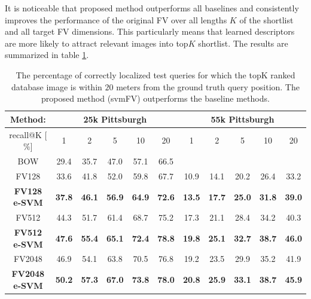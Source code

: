 \documentclass[table]{article} %
\begin{document}
		It is noticeable that proposed method outperforms all baselines and consistently improves the performance of the original FV over all lengths $K$ of the shortlist and all target FV dimensions. This particularly means that learned descriptors are more likely to attract relevant images into top$K$ shortlist. The results are summarized in table \ref{tab:recall}.

\begin{table}[t!]
\begin{centering}
	\begin{tabularx}{0.94\linewidth}{|c|c c c c c|c c c c c|}
		\hline 
		\rowcolor{maroon!50}
		Method: & \multicolumn{5}{c|}{25k Pittsburgh} & \multicolumn{5}{c|}{55k Pittsburgh} \\
		\hline 
		\hline 
		\rowcolor{maroon!50}
		recall@K [$\%$] & 1 & 2 & 5 & 10 & 20 & 1 & 2 & 5 & 10 & 20\\
		\hline
		\rowcolor{maroon!10}
		BOW & 29.4 & 35.7 & 47.0 & 57.1 & 66.5 &  &  &  &  & \\
        \hline
		\rowcolor{maroon!10}
		FV128         & 33.6 & 41.8 & 52.0 & 59.8 & 67.7 & 10.9 & 14.1 & 20.2 & 26.4 & 33.2 \\
		\rowcolor{maroon!10}
		\textbf{FV128 e-SVM}   & \textbf{37.8}  & \textbf{46.1} & \textbf{56.9} & \textbf{64.9} & \textbf{72.6}  &
                                 \textbf{13.5}  &  \textbf{17.7}  &  \textbf{25.0}  &  \textbf{31.8}  &  \textbf{39.0} \\
        \hline
        \rowcolor{maroon!10}
        FV512         & 44.3 & 51.7 & 61.4 & 68.7 & 75.2 & 17.3 &  21.1 &  28.4 &  34.2 &  40.3 \\
        \rowcolor{maroon!10}
        \textbf{FV512 e-SVM}   & \textbf{47.6}  & \textbf{55.4} & \textbf{65.1} & \textbf{72.4} & \textbf{78.8}  &
                                 \textbf{19.8} &  \textbf{25.1} &  \textbf{32.7}  & \textbf{38.7} &  \textbf{46.0} \\
        \hline
		\rowcolor{maroon!10}
		FV2048        & 46.9  & 54.1 & 63.8 & 70.5 & 76.8 & 19.2 & 23.5 & 29.9 &  35.2 &  41.9 \\
		\rowcolor{maroon!10}
		\textbf{FV2048 e-SVM}  & \textbf{50.2} & \textbf{57.3} & \textbf{67.0} & \textbf{73.8} & \textbf{78.0} &
        \textbf{20.8} & \textbf{25.9} & \textbf{33.1} & \textbf{38.7} & \textbf{45.9}\\
        \hline
	\end{tabularx}
	\caption{ \textcolor{myRed}{}
		The percentage of correctly localized test queries for which the topK ranked database image is within $20$ meters from the ground truth query position. The proposed method (svmFV) outperforms the baseline methods.
		}
	\label{tab:recall}
\end{centering}
\end{table}
\end{document}
